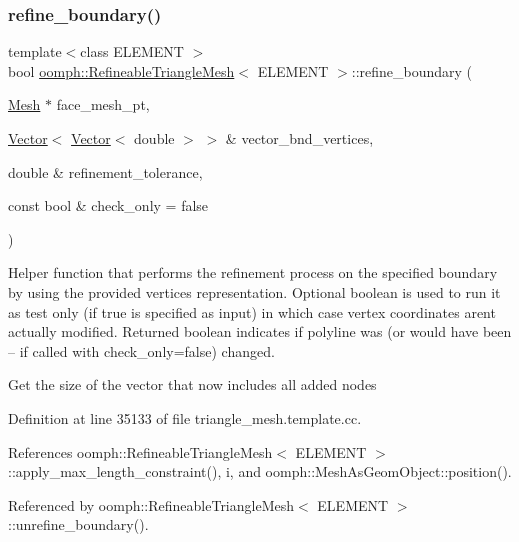 \subsubsection{\texorpdfstring{refine\+\_\+boundary()}{refine\_boundary()}}
{\footnotesize\ttfamily template$<$class E\+L\+E\+M\+E\+NT $>$ \\
bool \hyperlink{classoomph_1_1RefineableTriangleMesh}{oomph\+::\+Refineable\+Triangle\+Mesh}$<$ E\+L\+E\+M\+E\+NT $>$\+::refine\+\_\+boundary (\begin{DoxyParamCaption}\item[{\hyperlink{classoomph_1_1Mesh}{Mesh} $\ast$}]{face\+\_\+mesh\+\_\+pt,  }\item[{\hyperlink{classoomph_1_1Vector}{Vector}$<$ \hyperlink{classoomph_1_1Vector}{Vector}$<$ double $>$ $>$ \&}]{vector\+\_\+bnd\+\_\+vertices,  }\item[{double \&}]{refinement\+\_\+tolerance,  }\item[{const bool \&}]{check\+\_\+only = {\ttfamily false} }\end{DoxyParamCaption})\hspace{0.3cm}{\ttfamily [protected]}}



Helper function that performs the refinement process on the specified boundary by using the provided vertices representation. Optional boolean is used to run it as test only (if true is specified as input) in which case vertex coordinates aren\textquotesingle{}t actually modified. Returned boolean indicates if polyline was (or would have been -- if called with check\+\_\+only=false) changed. 

Get the size of the vector that now includes all added nodes 

Definition at line 35133 of file triangle\+\_\+mesh.\+template.\+cc.



References oomph\+::\+Refineable\+Triangle\+Mesh$<$ E\+L\+E\+M\+E\+N\+T $>$\+::apply\+\_\+max\+\_\+length\+\_\+constraint(), i, and oomph\+::\+Mesh\+As\+Geom\+Object\+::position().



Referenced by oomph\+::\+Refineable\+Triangle\+Mesh$<$ E\+L\+E\+M\+E\+N\+T $>$\+::unrefine\+\_\+boundary().

\mbox{\label{classoomph_1_1RefineableTriangleMesh_abd9edf3c6c57a337301abe8828ca0567}} 
